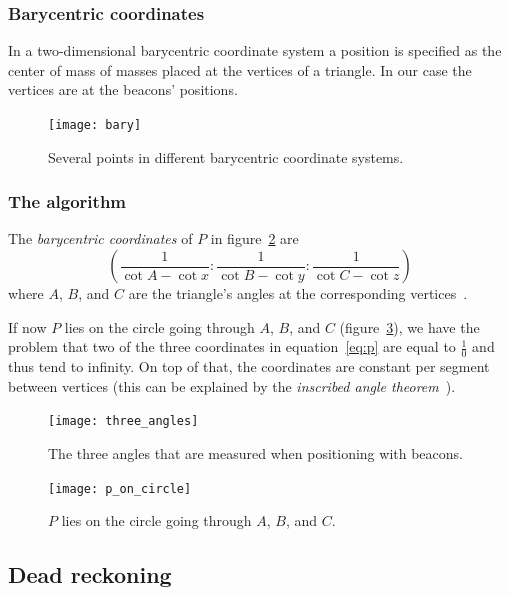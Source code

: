 \documentclass[a4paper, 12pt]{paper}
\begin{document}
\subsubsection{Barycentric coordinates}
\label{ss2:bary}

In a two-dimensional barycentric coordinate system a position is specified as
the center of mass of masses placed at the vertices of a triangle. In our case
the vertices are at the beacons' positions.

\begin{figure}[H]
    \centering
    \texttt{[image: bary]}
    \caption{Several points in different barycentric coordinate systems.}
\label{fig:bary}
\end{figure}

\subsubsection{The algorithm}
\label{ss2:algorithm}

The \emph{barycentric coordinates} of $P$ in figure~\ref{fig:three_angles} are
\begin{equation}
    \left(\frac{1}{\cot{A} - \cot{x}} :
          \frac{1}{\cot{B} - \cot{y}} :
          \frac{1}{\cot{C} - \cot{z}} \right)
    \label{eq:p}
\end{equation}
where $A$, $B$, and $C$ are the triangle's angles at the corresponding
vertices~\cite{bary_coordinates_formula}.

If now $P$ lies on the circle going through $A$, $B$, and
$C$ (figure~\ref{fig:p_on_circle}), we have the problem that two of the three coordinates
in equation~\ref{eq:p} are equal to $\frac{1}{0}$ and thus tend to infinity.
On top of that, the coordinates are constant per segment between vertices (this
can be explained by the
\emph{inscribed angle theorem}~\cite{wikipedia_inscribed_angle}).

\begin{figure}[H]
    \centering
    \texttt{[image: three\_angles]}
    \caption{The three angles that are measured when positioning with beacons.}
\label{fig:three_angles}
\end{figure}

\begin{figure}[H]
    \centering
    \texttt{[image: p\_on\_circle]}
    \caption{$P$ lies on the circle going through $A$, $B$, and $C$.}
\label{fig:p_on_circle}
\end{figure}

\subsection{Dead reckoning}
\end{document}
